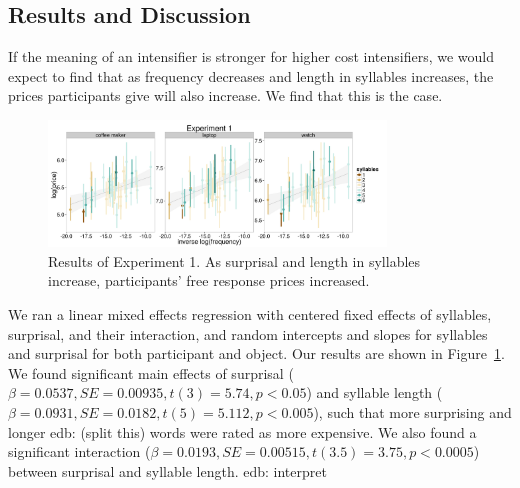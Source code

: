 \documentclass[10pt,letterpaper]{article}
\newcommand{\todo}[1]{{\color{red}#1}}
\begin{document}
\subsection{Results and Discussion}

If the meaning of an intensifier is stronger for higher cost intensifiers, we would expect to find that as frequency decreases and length in syllables increases, the prices participants give will also increase. We find that this is the case.

\begin{figure}[ht]
\begin{center}
\includegraphics[width=0.8\textwidth]{analysis_files_for_writeup/images/exp1-plot.png}
\end{center}
\caption{Results of Experiment 1. As surprisal and length in syllables increase, participants' free response prices increased.} 
\label{exp1-plot}
\end{figure}

We ran a linear mixed effects regression with centered fixed effects of syllables, surprisal, and their interaction, and random intercepts and slopes for syllables and surprisal for both participant and object.
Our results are shown in Figure~\ref{exp1-plot}. We found significant main effects of surprisal ($\beta=0.0537, SE=0.00935, t(3)=5.74, p<0.05$) and syllable length ($\beta=0.0931, SE=0.0182, t(5)=5.112, p<0.005$), such that more surprising and longer 
\todo{edb: (split this}) 
words were rated as more expensive. We also found a significant interaction ($\beta=0.0193, SE=0.00515, t(3.5)=3.75, p<0.0005$) between surprisal and syllable length.
\todo{edb: interpret}
\end{document}
